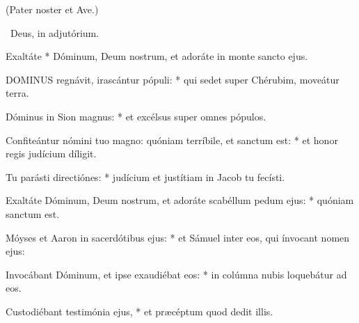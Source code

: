 

(Pater noster et Ave.)

\V\ Deus, in adjutórium.

 Exaltáte * Dóminum, Deum nostrum, et adoráte in monte sancto ejus.


\lettrine[lines=2]{D}{OMINUS} regnávit, irascántur pópuli: * qui sedet super Chérubim, moveátur terra.

Dóminus in Sion magnus: * et excélsus super omnes pópulos.

Confiteántur nómini tuo magno: quóniam terríbile, et sanctum est: * et honor regis judícium díligit.

Tu parásti directiónes: * judícium et justítiam in Jacob tu fecísti.

Exaltáte Dóminum, Deum nostrum, et adoráte scabéllum pedum ejus: * quóniam sanctum est.

Móyses et Aaron in sacerdótibus ejus: * et Sámuel inter eos, qui ínvocant nomen ejus:

Invocábant Dóminum, et ipse exaudiébat eos: * in colúmna nubis loquebátur ad eos.

Custodiébant testimónia ejus, * et præcéptum quod dedit illis.

